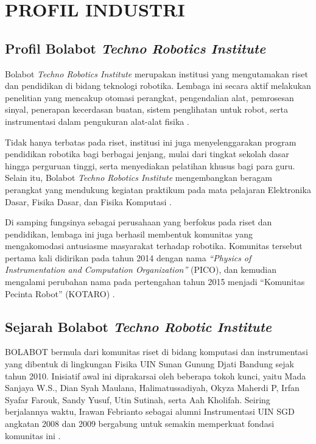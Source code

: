 \chapter{PROFIL INDUSTRI}

\section{Profil Bolabot \textit{Techno Robotics Institute}}
Bolabot \textit{Techno Robotics Institute} merupakan institusi yang mengutamakan riset dan pendidikan di bidang teknologi robotika. Lembaga ini secara aktif melakukan penelitian yang mencakup otomasi perangkat, pengendalian alat, pemrosesan sinyal, penerapan kecerdasan buatan, sistem penglihatan untuk robot, serta instrumentasi dalam pengukuran alat-alat fisika \cite{15}.

Tidak hanya terbatas pada riset, institusi ini juga menyelenggarakan program pendidikan robotika bagi berbagai jenjang, mulai dari tingkat sekolah dasar hingga perguruan tinggi, serta menyediakan pelatihan khusus bagi para guru. Selain itu, Bolabot \textit{Techno Robotics Institute} mengembangkan beragam perangkat yang mendukung kegiatan praktikum pada mata pelajaran Elektronika Dasar, Fisika Dasar, dan Fisika Komputasi \cite{15}.

Di samping fungsinya sebagai perusahaan yang berfokus pada riset dan pendidikan, lembaga ini juga berhasil membentuk komunitas yang mengakomodasi antusiasme masyarakat terhadap robotika. Komunitas tersebut pertama kali didirikan pada tahun 2014 dengan nama \textit{“Physics of Instrumentation and Computation Organization”} (PICO), dan kemudian mengalami perubahan nama pada pertengahan tahun 2015 menjadi “Komunitas Pecinta Robot” (KOTARO) \cite{15}.

\section{Sejarah Bolabot \textit{Techno Robotic Institute}}
BOLABOT bermula dari komunitas riset di bidang komputasi dan instrumentasi yang dibentuk di lingkungan Fisika UIN Sunan Gunung Djati Bandung sejak tahun 2010. Inisiatif awal ini diprakarsai oleh beberapa tokoh kunci, yaitu Mada Sanjaya W.S., Dian Syah Maulana, Halimatussadiyah, Okyza Maherdi P, Irfan Syafar Farouk, Sandy Yusuf, Utin Sutinah, serta Aah Kholifah. Seiring berjalannya waktu, Irawan Febrianto sebagai alumni Instrumentasi UIN SGD angkatan 2008 dan 2009 bergabung untuk semakin memperkuat fondasi komunitas ini \cite{15}.

